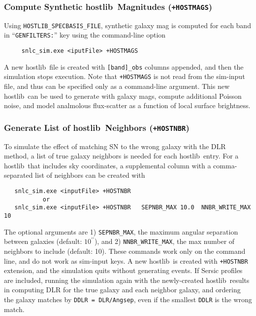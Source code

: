 \documentclass[12pt]{article}
\newcommand{\hostlib}{{\sc hostlib}}
\begin{document}
{\subsubsection{Compute Synthetic \hostlib\ Magnitudes ({\tt +HOSTMAGS})}
\label{sss:hostlib_synmag}

Using {\tt HOSTLIB\_SPECBASIS\_FILE}, synthetic galaxy mag is 
computed for each band in ``{\tt GENFILTERS:}'' key
using the command-line option
\begin{verbatim}
     snlc_sim.exe <iputFile> +HOSTMAGS
\end{verbatim}
A new \hostlib\ file is created with {\tt [band]\_obs} columns appended,
and then the simulation stops execution.
Note that {\tt +HOSTMAGS} is not read from the sim-input file, 
and thus can be specified only as a command-line argument.
This new \hostlib\ can be used to generate with galaxy mags,
compute additional Poisson noise, and model analmolous 
flux-scatter as a function of local surface brightness.

\subsubsection{Generate List of \hostlib\ Neighbors ({\tt +HOSTNBR})}
\label{sss:hostlib_NBR}

To simulate the effect of matching SN to the wrong galaxy 
with the DLR method,
a list of true galaxy neighbors is needed for each \hostlib\ entry. 
For a \hostlib\ that includes sky coordinates, a supplemental 
column with a comma-separated list of neighbors can be created with
%
\begin{verbatim}
   snlc_sim.exe <inputFile> +HOSTNBR
           or
   snlc_sim.exe <inputFile> +HOSTNBR   SEPNBR_MAX 10.0  NNBR_WRITE_MAX 10
\end{verbatim}
%
The optional arguments are 
1) {\tt SEPNBR\_MAX}, the maximum angular separation between galaxies
  (default: $10^{\prime\prime}$), and
2) {\tt NNBR\_WRITE\_MAX}, the max number of neighbors to include
  (default: 10).
These commands work only on the command line, and do not work
as sim-input keys. A new \hostlib\ is created with {\tt +HOSTNBR}
extension, and the simulation quits without generating events.
If Sersic profiles are included, running the simulation again with the 
newly-created \hostlib\ results in computing DLR for the true galaxy and
each neighbor galaxy, and ordering the galaxy matches by 
{\tt DDLR = DLR/Angsep}, 
even if the smallest {\tt DDLR} is the wrong match.

}
\end{document}
